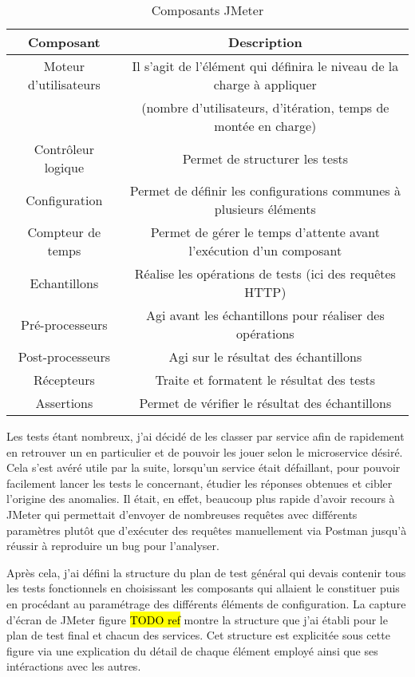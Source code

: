 \begin{table}[h!]
	\center
	\begin{tabular}{| c | c |}
     \hline
     Composant & Description \\ \hline
     Moteur d’utilisateurs & Il s’agit de l’élément qui définira le niveau de la charge à appliquer \\ & (nombre d’utilisateurs, d’itération, temps de montée en charge) \\ \hline
     Contrôleur logique & Permet de structurer les tests \\ \hline
     Configuration & Permet de définir les configurations communes à plusieurs éléments \\ \hline
     Compteur de temps & Permet de gérer le temps d’attente avant l’exécution d’un composant \\ \hline
     Echantillons & Réalise les opérations de tests (ici des requêtes HTTP) \\ \hline
     Pré-processeurs & Agi avant les échantillons pour réaliser des opérations \\ \hline
     Post-processeurs & Agi sur le résultat des échantillons \\ \hline
     Récepteurs & Traite et formatent le résultat des tests \\ \hline
     Assertions & Permet de vérifier le résultat des échantillons \\ \hline
	\end{tabular}
	\caption{Composants JMeter}
	\label{composantJMeter}
\end{table}
	
	Les tests étant nombreux, j’ai décidé de les classer par service afin de rapidement en retrouver un en particulier et de pouvoir les jouer selon le microservice désiré. Cela s'est avéré utile par la suite, lorsqu'un service était défaillant, pour pouvoir facilement lancer les tests le concernant, étudier les réponses obtenues et cibler l'origine des anomalies. Il était, en effet, beaucoup plus rapide d'avoir recours à JMeter qui permettait d'envoyer de nombreuses requêtes avec différents paramètres plutôt que d'exécuter des requêtes manuellement via Postman jusqu'à réussir à reproduire un bug pour l'analyser. 
	
	Après cela, j’ai défini la structure du plan de test général qui devais contenir tous les tests fonctionnels en choisissant les composants qui allaient le constituer puis en procédant au paramétrage des différents éléments de configuration. La capture d’écran de JMeter figure \hl{TODO ref} montre la structure que j’ai établi pour le plan de test final et chacun des services. Cet structure est explicitée sous cette figure via une explication du détail de chaque élément employé ainsi que ses intéractions avec les autres. \\
	
